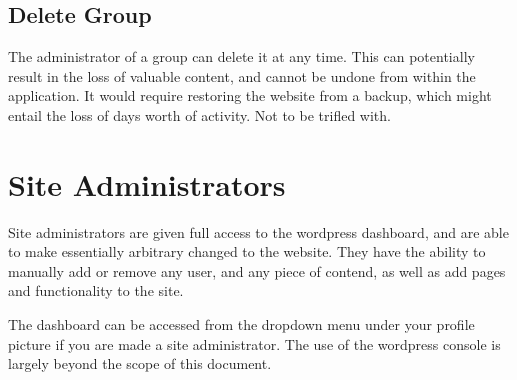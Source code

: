 \documentclass[10pt]{article}
\begin{document}
\subsection{Delete Group}

\begin{flushleft}
The administrator of a group can delete it at any time.  This can potentially result in the loss of valuable content, and cannot be undone from within the application.  It would require restoring the website from a backup, which might entail the loss of days worth of activity.  Not to be trifled with. 
\end{flushleft}

\section{Site Administrators}

\begin{flushleft}
Site administrators are given full access to the wordpress dashboard, and are able to make essentially arbitrary changed to the website.  They have the ability to manually add or remove any user, and any piece of contend, as well as add pages and functionality to the site.
\end{flushleft}

\begin{flushleft}
The dashboard can be accessed from the dropdown menu under your profile picture if you are made a site administrator.  The use of the wordpress console is largely beyond the scope of this document.
\end{flushleft}



\end{document}

